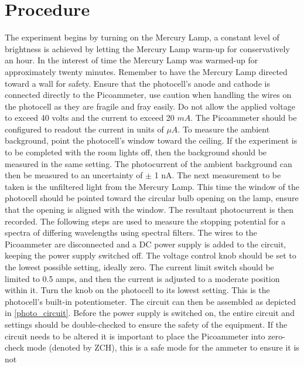 \documentclass[a4paper]{article}
\begin{document}
\section{Procedure}


\qq The experiment begins by turning on the Mercury Lamp, a constant
level of brightness is achieved by letting the Mercury Lamp warm-up
for conservatively an hour. In the interest of time the Mercury Lamp
was warmed-up for approximately twenty minutes. Remember to have the
Mercury Lamp directed toward a wall for safety. Ensure that the
photocell's anode and cathode is connected directly to the
Picoammeter, use caution when handling the wires on the photocell as
they are fragile and fray easily. Do not allow the applied voltage to
exceed 40 volts and the current to exceed 20 $mA$. The
Picoammeter should be configured to readout the current in units of
$\mu A$. To measure the ambient background, point the photocell's
window toward the ceiling. If the experiment is to be completed with
the room lights off, then the background should be measured in the
same setting. The photocurrent of the ambient background can then be
measured to an uncertainty of $\pm$ 1 nA. The next measurement to
be taken is the unfiltered light from the Mercury Lamp. This time the
window of the photocell should be pointed toward the circular bulb
opening on the lamp, ensure that the opening is aligned with the
window. The resultant photocurrent is then recorded. The following
steps are used to measure the stopping potential for a spectra of
differing wavelengths using spectral filters. The wires to the
Picoammeter are disconnected and a DC power supply is added to the
circuit, keeping the power supply switched off. The voltage control
knob should be set to the lowest possible setting, ideally zero. The
current limit switch should be limited to 0.5 amps, and then the
current is adjusted to a moderate position within it. Turn the knob on
the photocell to its lowest setting. This is the photocell's built-in
potentiometer. The circuit can then be assembled as depicted in
\ref{photo_circuit}. Before the power supply is switched on, the
entire circuit and settings should be double-checked to ensure the
safety of the equipment. If the circuit needs to be altered it is
important to place the Picoammeter into zero-check mode (denoted by
ZCH), this is a safe mode for the ammeter to ensure it is not
\end{document}
